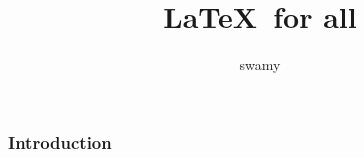 \documentclass[11pt]{beamer}
\begin{document}
	\author{swamy}
	\title{\LaTeX~for all}
	\begin{frame}
	\maketitle
\end{frame}

\begin{frame}
\frametitle{Introduction}
\end{frame}
\end{document}
